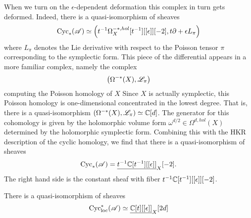 When we turn on the $\epsilon$-dependent deformation this complex in turn gets deformed. 
Indeed, there is a quasi-isomorphism of sheaves
\[
{\rm Cyc}_* (\mathscr A) \simeq \left(t^{-1} \Omega^{-*,hol}_X [t^{-1}] [[\epsilon]] [-2], t \partial + \epsilon L_\pi \right) 
\] 
where $L_\pi$ denotes the Lie derivative with respect to the Poisson tensor $\pi$ corresponding to the symplectic form. 
This piece of the differential appears in a more familiar complex, namely the complex 
\[
\left(\Omega^{-*}(X), \mathscr L_\pi\right)
\]
computing the Poisson homology of $X$
Since $X$ is actually symplectic, this Poisson homology is one-dimensional concentrated in the lowest degree. 
That is, there is a quasi-isomorphism $\left(\Omega^{-*}(X), \mathscr L_\pi\right) \simeq \mathbb C [d]$. 
The generator for this cohomology is given by the holomorphic volume form $\omega^{d/2} \in \Omega^{d,hol}(X)$ determined by the holomorphic symplectic form. 
Combining this with the HKR description of the cyclic homology, we find that there is a quasi-isomorphism of sheaves
\[
{\rm Cyc}_* (\mathscr A) = \underline{t^{-1} \mathbb C[t^{-1}] [[\epsilon]]}_X [-2]  .
\]
The right hand side is the constant sheaf with fiber $t^{-1} \mathbb C[t^{-1}] [[\epsilon]] [-2]$.  

\begin{lem}
There is a quasi-isomorphism of sheaves
\[
{\rm Cyc}_{\rm loc}^*(\mathscr A) \simeq \underline{\mathbb C [t] [[\epsilon]]}_{X} [2d]
\]
\end{lem}


